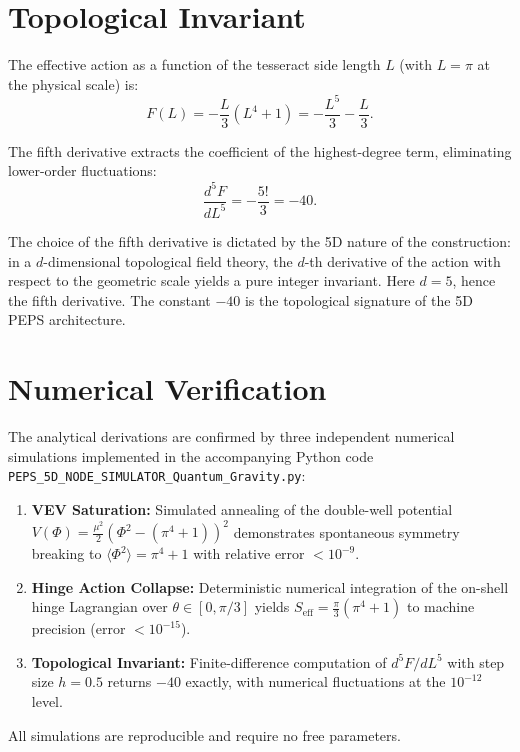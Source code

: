 \documentclass[12pt]{article}
\begin{document}
\section{Topological Invariant}

The effective action as a function of the tesseract side length \(L\) (with \(L = \pi\) at the physical scale) is:
\[
F(L) = -\frac{L}{3}(L^4 + 1) = -\frac{L^5}{3} - \frac{L}{3}.
\]

The fifth derivative extracts the coefficient of the highest-degree term, eliminating lower-order fluctuations:
\[
\frac{d^5 F}{dL^5} = -\frac{5!}{3} = -40.
\]

The choice of the fifth derivative is dictated by the 5D nature of the construction: in a \(d\)-dimensional topological field theory, the \(d\)-th derivative of the action with respect to the geometric scale yields a pure integer invariant. Here \(d=5\), hence the fifth derivative. The constant \(-40\) is the topological signature of the 5D PEPS architecture.

\section{Numerical Verification}

The analytical derivations are confirmed by three independent numerical simulations implemented in the accompanying Python code \texttt{PEPS\_5D\_NODE\_SIMULATOR\_Quantum\_Gravity.py}:

\begin{enumerate}
    \item \textbf{VEV Saturation:} Simulated annealing of the double-well potential \(V(\Phi) = \frac{\mu^2}{2}(\Phi^2 - (\pi^4+1))^2\) demonstrates spontaneous symmetry breaking to \(\langle\Phi^2\rangle = \pi^4 + 1\) with relative error \(< 10^{-9}\).
    
    \item \textbf{Hinge Action Collapse:} Deterministic numerical integration of the on-shell hinge Lagrangian over \(\theta \in [0, \pi/3]\) yields \(S_{\text{eff}} = \frac{\pi}{3}(\pi^4+1)\) to machine precision (error \(< 10^{-15}\)).
    
    \item \textbf{Topological Invariant:} Finite-difference computation of \(d^5F/dL^5\) with step size \(h = 0.5\) returns \(-40\) exactly, with numerical fluctuations at the \(10^{-12}\) level.
\end{enumerate}

All simulations are reproducible and require no free parameters.
\end{document}
